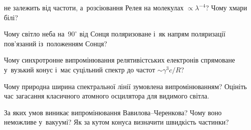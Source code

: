 \begin{Questions}
\begin{quizlist}
	  не залежить від частоти, а~розсіювання Релея на молекулах $\propto\lambda^{-4}$? Чому хмари білі?
	\item Чому світло неба на~$90^\circ$ від Сонця поляризоване і~як напрям поляризації
	  пов'язаний із~положенням Сонця?
	\item Чому синхротронне випромінювання релятивістських електронів спрямоване у~вузький конус
	  і~має суцільний спектр до частот $\sim\gamma^3c/R$?
	\item Чому природна ширина спектральної лінії зумовлена випромінюванням? Оцініть
	  час загасання класичного атомного осцилятора для видимого світла.
	\item За яких умов виникає випромінювання Вавилова--Черенкова? Чому воно неможливе у~вакуумі?
	  Як за кутом конуса визначити швидкість частинки?
\end{quizlist}
\end{Questions}

